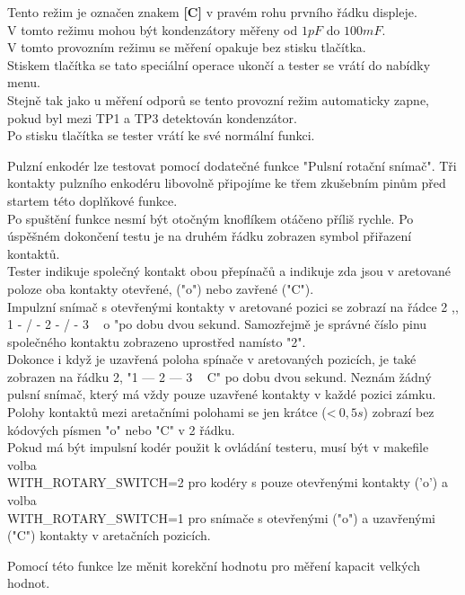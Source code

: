 \begin{description}
Tento režim je označen znakem {\bf[C]} v pravém rohu prvního řádku displeje.\\
V tomto režimu mohou být kondenzátory měřeny od \(1pF\) do \(100mF\).\\
V tomto provozním režimu se měření opakuje bez stisku tlačítka.\\
Stiskem tlačítka se tato speciální operace ukončí a tester se vrátí do nabídky menu.\\
Stejně tak jako u měření odporů se tento provozní režim automaticky zapne,
pokud byl mezi TP1 a TP3 detektován kondenzátor.\\
Po stisku tlačítka se tester vrátí ke své normální funkci.
\vspace{-0.3cm}
 \item[Pulzní Enkodér]
Pulzní enkodér lze testovat pomocí dodatečné funkce "Pulsní rotační snímač".
Tři kontakty pulzního enkodéru libovolně připojíme ke třem zkušebním pinům před startem této doplňkové funkce.\\
Po spuštění funkce nesmí být otočným knoflíkem otáčeno příliš rychle.
Po úspěšném dokončení testu je na druhém řádku zobrazen symbol přiřazení kontaktů.\\
Tester indikuje společný kontakt obou přepínačů a indikuje zda jsou v aretované poloze oba kontakty
otevřené, ("o") nebo zavřené ("C").\\
Impulzní snímač s otevřenými kontakty v aretované pozici se zobrazí na řádce 2 ,, 1 - / - 2 - / - 3 ~ o "po dobu dvou sekund.
Samozřejmě je správné číslo pinu společného kontaktu zobrazeno uprostřed namísto "2".\\
Dokonce i když je uzavřená poloha spínače v aretovaných pozicích,
je také zobrazen na řádku 2, "1 --- 2 --- 3 ~ C" po dobu dvou sekund.
Neznám žádný pulsní snímač, který má vždy pouze uzavřené kontakty v každé pozici zámku.
Polohy kontaktů mezi aretačními polohami se jen krátce (\textless\(~0,5s\))  zobrazí bez kódových písmen "o" nebo "C" v 2 řádku.\\
Pokud má být impulsní kodér použit k ovládání testeru, musí být v makefile  volba\\
WITH\_ROTARY\_SWITCH=2 pro kodéry s pouze otevřenými kontakty ('o') a volba\\ WITH\_ROTARY\_SWITCH=1  pro snímače s otevřenými ("o") a uzavřenými ("C") kontakty v aretačních pozicích.
\vspace{-0.3cm}
\item[C(\(\mu F\))-korekce]
Pomocí této funkce lze měnit korekční hodnotu pro měření kapacit velkých hodnot.\\

\end{description}
